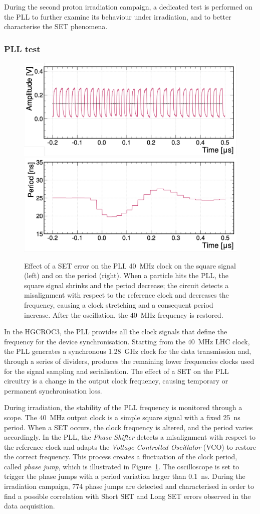 \bigbreak

During the second proton irradiation campaign, a dedicated test is performed on the PLL to further examine its behaviour under irradiation, and to better characterise the SET phenomena.

\subsubsection{PLL test}

\begin{figure}[b!]
    \centering
    \includegraphics[width=0.45\linewidth]{Figures/HGCAL/SET_PLL_Clock.pdf}
    \includegraphics[width=0.45\linewidth]{Figures/HGCAL/SET_PLL_Period.pdf}
    \caption{Effect of a SET error on the PLL 40~MHz clock on the square signal (left) and on the period (right). When a particle hits the PLL, the square signal shrinks and the period decrease; the circuit detects a misalignment with respect to the reference clock and decreases the frequency, causing a clock stretching and a consequent period increase. After the oscillation, the 40~MHz frequency is restored.}
    \label{fig:SET_PLL}
\end{figure}

In the HGCROC3, the PLL provides all the clock signals that define the frequency for the device synchronisation. Starting from the 40~MHz LHC clock, the PLL generates a synchronous 1.28~GHz clock for the data transmission and, through a series of dividers, produces the remaining lower frequencies clocks used for the signal sampling and serialisation. The effect of a SET on the PLL circuitry is a change in the output clock frequency, causing temporary or permanent synchronisation loss.

\bigbreak

During irradiation, the stability of the PLL frequency is monitored through a scope. The 
40~MHz output clock is a simple square signal with a fixed 25~ns period.
When a SET occurs, the clock frequency is altered, and the period varies accordingly. 
In the PLL, the \textit{Phase Shifter} detects a misalignment with respect to the reference clock and adapts the \textit{Voltage-Controlled Oscillator} (VCO) to restore the correct frequency. This process creates a fluctuation of the clock period, called \textit{phase jump}, which is illustrated in Figure~\ref{fig:SET_PLL}.
The oscilloscope is set to trigger the phase jumps with a period variation larger than 0.1~ns. During the irradiation campaign, 774 phase jumps are detected and characterised in order to find a possible correlation with Short SET and Long SET errors observed in the data acquisition.


